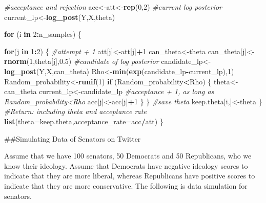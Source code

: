 \documentclass[]{book}
\newenvironment{Shaded}{\begin{snugshade}}{\end{snugshade}}
\newcommand{\CommentTok}[1]{\textcolor[rgb]{0.56,0.35,0.01}{\textit{#1}}}
\newcommand{\ControlFlowTok}[1]{\textcolor[rgb]{0.13,0.29,0.53}{\textbf{#1}}}
\newcommand{\DataTypeTok}[1]{\textcolor[rgb]{0.13,0.29,0.53}{#1}}
\newcommand{\DecValTok}[1]{\textcolor[rgb]{0.00,0.00,0.81}{#1}}
\newcommand{\FloatTok}[1]{\textcolor[rgb]{0.00,0.00,0.81}{#1}}
\newcommand{\KeywordTok}[1]{\textcolor[rgb]{0.13,0.29,0.53}{\textbf{#1}}}
\newcommand{\NormalTok}[1]{#1}
\newcommand{\OperatorTok}[1]{\textcolor[rgb]{0.81,0.36,0.00}{\textbf{#1}}}
\begin{document}
\begin{Shaded}
\begin{Highlighting}[]
\CommentTok{#acceptance and rejection  }
\NormalTok{  acc<-att<-}\KeywordTok{rep}\NormalTok{(}\DecValTok{0}\NormalTok{,}\DecValTok{2}\NormalTok{)}
\CommentTok{#current log posterior}
\NormalTok{  current_lp<-}\KeywordTok{log_post}\NormalTok{(Y,X,theta)}

  \ControlFlowTok{for}\NormalTok{ (i }\ControlFlowTok{in} \DecValTok{2}\OperatorTok{:}\NormalTok{n_samples)  }
\NormalTok{  \{}
    
    \ControlFlowTok{for}\NormalTok{(j }\ControlFlowTok{in} \DecValTok{1}\OperatorTok{:}\DecValTok{2}\NormalTok{)}
\NormalTok{    \{}
      \CommentTok{#attempt + 1}
\NormalTok{      att[j]<-att[j]}\OperatorTok{+}\DecValTok{1}
\NormalTok{      can_theta<-theta}
\NormalTok{      can_theta[j]<-}\KeywordTok{rnorm}\NormalTok{(}\DecValTok{1}\NormalTok{,theta[j],}\FloatTok{0.5}\NormalTok{)}
      \CommentTok{#candidate of log posterior}
\NormalTok{      candidate_lp<-}\KeywordTok{log_post}\NormalTok{(Y,X,can_theta)}
\NormalTok{      Rho<-}\KeywordTok{min}\NormalTok{(}\KeywordTok{exp}\NormalTok{(candidate_lp}\OperatorTok{-}\NormalTok{current_lp),}\DecValTok{1}\NormalTok{)}
\NormalTok{      Random_probability<-}\KeywordTok{runif}\NormalTok{(}\DecValTok{1}\NormalTok{)}
      \ControlFlowTok{if}\NormalTok{ (Random_probability}\OperatorTok{<}\NormalTok{Rho)}
\NormalTok{      \{}
\NormalTok{        theta<-can_theta}
\NormalTok{        current_lp<-candidate_lp}
        \CommentTok{#acceptance + 1, as long as Random_probability<Rho}
\NormalTok{        acc[j]<-acc[j]}\OperatorTok{+}\DecValTok{1}
\NormalTok{      \}}
\NormalTok{    \}}
    \CommentTok{#save theta}
\NormalTok{    keep.theta[i,]<-theta}
\NormalTok{  \}}
\CommentTok{#Return: including theta and acceptance rate}
  \KeywordTok{list}\NormalTok{(}\DataTypeTok{theta=}\NormalTok{keep.theta,}\DataTypeTok{acceptance_rate=}\NormalTok{acc}\OperatorTok{/}\NormalTok{att)}
\NormalTok{\}}
\end{Highlighting}
\end{Shaded}

\#\#Simulating Data of Senators on Twitter

Assume that we have 100 senators, 50 Democrats and 50 Republicans, who we know their ideology. Assume that Democrats have negative ideology scores to indicate that they are more liberal, whereas Republicans have positive scores to indicate that they are more conservative. The following is data simulation for senators.
\end{document}
